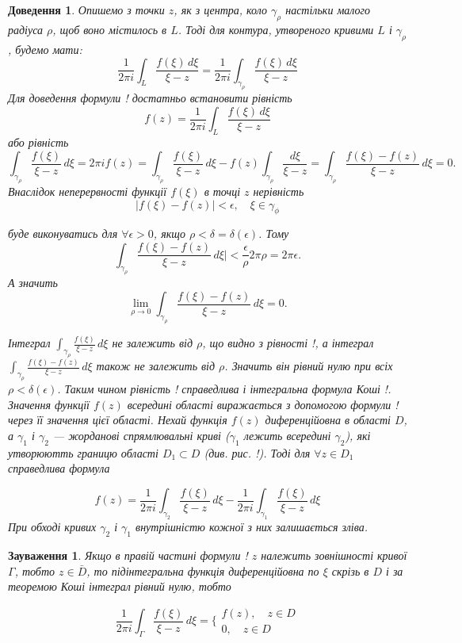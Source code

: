 \documentclass[12pt,fleqn]{article}
\theoremstyle{theorem}
\theoremstyle{proof}
\newtheorem*{dov}{Доведення}
\newtheorem{remark}{Зауваження}[section]
\numberwithin{figure}{section}
\numberwithin{equation}{section}
\begin{document}
\begin{dov}
Опишемо з точки $z$, як з центра, коло $\gamma_\rho$ настільки малого радіуса $\rho$, щоб воно містилось в $L$. Тоді для контура, утвореного кривими $L$ і $\gamma_\rho$, будемо мати:
\begin{equation}\label{xy}
\frac{1}{2\pi i}\int_{L}\frac{f(\xi)\,d\xi}{\xi-z} = \frac{1}{2\pi i}\int_{\gamma_\rho} \frac{f(\xi)\,d\xi}{\xi-z}
\end{equation}
Для доведення формули ! достатньо встановити рівність
\[ f(z)= \frac{1}{2\pi i} \int_{L}\frac{f(\xi)\,d\xi}{\xi-z} \]
або рівність
\begin{equation}\label{xy}
\int_{\gamma_\rho}\frac{f(\xi)}{\xi-z}\,d\xi=2\pi if(z) = \int_{\gamma_\rho}\frac{f(\xi)}{\xi-z}\,d\xi-f(z)\int_{\gamma_\rho}\frac{d\xi}{\xi-z}=\int_{\gamma_\rho}\frac{f(\xi)-f(z)}{\xi-z}\,d\xi=0.
\end{equation}
Внаслідок неперервності функції $f(\xi)$ в точці $z$ нерівність
\[ |f(\xi)-f(z)|<\epsilon, \quad \xi\in\gamma_\phi \]

буде виконуватись для $\forall\epsilon>0$, якщо $\rho<\delta=\delta(\epsilon)$. Тому
\[ \int_{\gamma_\rho} \frac{f(\xi)-f(z)}{\xi-z}\,d\xi|< \frac{\epsilon}{\rho} 2\pi\rho=2\pi\epsilon. \]
А значить
\[ \lim_{\rho \to 0} \int_{\gamma_\rho} \frac{f(\xi)-f(z)}{\xi-z}\,d\xi=0. \]

Інтеграл $\int_{\gamma_\rho} \frac{f(\xi)}{\xi - z}\,d\xi$ не залежить від $\rho$, що видно з рівності !, а інтеграл $\int_{\gamma_\rho} \frac{f(\xi)-f(z)}{\xi - z}\,d\xi$ також не залежить від $\rho$. Значить він рівний нулю при всіх $\rho < \delta(\epsilon)$. Таким чином рівність ! справедлива і інтегральна формула Коші !.
Значення функції $f(z)$ всередині області виражається з допомогою формули ! через її значення цієї області.
Нехай функція $f(z)$ диференційовна в області $D$, а $\gamma_1$ і $\gamma_2$ --- жорданові спрямлювальні криві ($\gamma_1$ лежить всередині $\gamma_2$), які утворюютть границю області $D_1 \subset D$ (див. рис. !). Тоді для $\forall z \in D_1$ справедлива формула

\begin{equation}\label{xy}
f(z)=\frac{1}{2\pi i}\int_{\gamma_2}\frac{f(\xi)}{\xi-z}\,d\xi-\frac{1}{2\pi i}\int_{\gamma_1}\frac{f(\xi)}{\xi-z}\,d\xi
\end{equation}
При обході кривих $\gamma_2$ і $\gamma_1$ внутрішністю кожної з них залишається зліва.
\end{dov}

\begin{remark}
Якщо в правій частині формули ! $z$ належить зовнішності кривої $\Gamma$, тобто $z \in \bar{D}$, то підінтегральна функція диференційовна по $\xi$ скрізь в $D$ і за теоремою Коші інтеграл рівний нулю, тобто

\[ \frac{1}{2\pi i} \int_{\Gamma} \frac{f(\xi)}{\xi-z}\,d\xi= \bigg\{ \begin{matrix} f(z), \quad z\in D \\ 0, \quad z \in D \end{matrix} \]

\end{remark}
\end{document}
